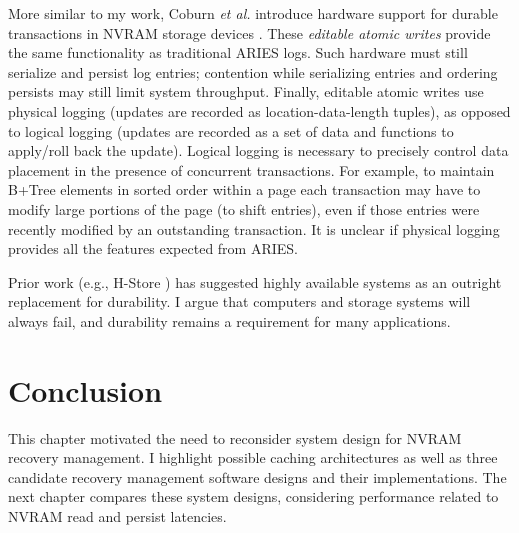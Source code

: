 More similar to my work, Coburn \emph{et al.} introduce hardware support for durable transactions in NVRAM storage devices \cite{Coburn13}.
These \emph{editable atomic writes} provide the same functionality as traditional ARIES logs.
Such hardware must still serialize and persist log entries; contention while serializing entries and ordering persists may still limit system throughput.
Finally, editable atomic writes use physical logging (updates are recorded as location-data-length tuples), as opposed to logical logging (updates are recorded as a set of data and functions to apply/roll back the update).
Logical logging is necessary to precisely control data placement in the presence of concurrent transactions.
For example, to maintain B+Tree elements in sorted order within a page each transaction may have to modify large portions of the page (to shift entries), even if those entries were recently modified by an outstanding transaction.
It is unclear if physical logging provides all the features expected from ARIES.


Prior work (e.g., H-Store \cite{StonebrakerMadden07}) has suggested highly available systems as an outright replacement for durability.
I argue that computers and storage systems will always fail, and durability remains a requirement for many applications.

\section{Conclusion}
\label{sec:OLTP_design:Conclusion}
This chapter motivated the need to reconsider system design for NVRAM recovery management.
I highlight possible caching architectures as well as three candidate recovery management software designs and their implementations.
The next chapter compares these system designs, considering performance related to NVRAM read and persist latencies.
